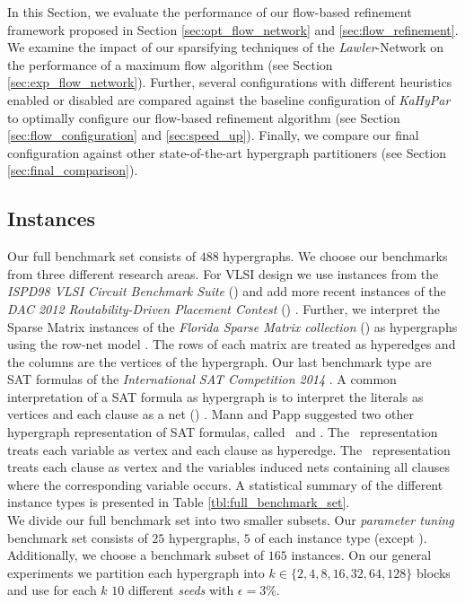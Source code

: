 In this Section, we evaluate the performance of our flow-based refinement framework proposed
in Section \ref{sec:opt_flow_network} and \ref{sec:flow_refinement}. We examine
the impact of our sparsifying techniques of the \emph{Lawler}-Network \cite{lawler1973} on the
performance of a maximum flow algorithm (see Section \ref{sec:exp_flow_network}). Further,
several configurations with different heuristics enabled or disabled are
compared against the baseline configuration of \emph{KaHyPar} to optimally
configure our flow-based refinement algorithm (see Section \ref{sec:flow_configuration} and
\ref{sec:speed_up}). Finally, we compare our final configuration against other
state-of-the-art hypergraph partitioners (see Section \ref{sec:final_comparison}).


\subsection{Instances}

Our full benchmark set consists of $488$ hypergraphs. We choose our benchmarks 
from three different research areas. For VLSI design we use instances from
the \emph{ISPD98 VLSI Circuit Benchmark Suite} (\ISPD) \cite{alpert1998ispd98} and add more recent
instances of the \emph{DAC 2012 Routability-Driven Placement Contest} (\DAC) \cite{viswanathan2012dac}.
Further, we interpret the Sparse Matrix instances of the \emph{Florida Sparse Matrix 
collection} (\SPM) \cite{davis2011university} as hypergraphs using the row-net model \cite{catalyurek1999hypergraph}.
The rows of each matrix are treated as hyperedges and the columns are the vertices of
the hypergraph. Our last benchmark type are SAT formulas of the \emph{International SAT
Competition 2014} \cite{belov2014application}. A common interpretation of a SAT formula 
as hypergraph is to interpret the literals as vertices and each clause as a net (\Literal) \cite{papa2007hypergraph}.
Mann and Papp \cite{mann2014formula} suggested two other hypergraph representation of
SAT formulas, called \Primal~and \Dual. The \Primal~representation treats each variable
as vertex and each clause as hyperedge. The \Dual~representation treats each clause as
vertex and the variables induced nets containing all clauses where the corresponding
variable occurs. A statistical summary of the different instance types is presented in
Table \ref{tbl:full_benchmark_set}. \\
We divide our full benchmark set into two smaller subsets. Our \emph{parameter tuning}
benchmark set consists of $25$ hypergraphs, $5$ of each instance type (except \DAC). Additionally,
we choose a benchmark subset of $165$ instances. On our general experiments we partition
each hypergraph into $k \in \{2,4,8,16,32,64,128\}$ blocks and use for each $k$ $10$ different
\emph{seeds} with $\epsilon = 3\%$.

